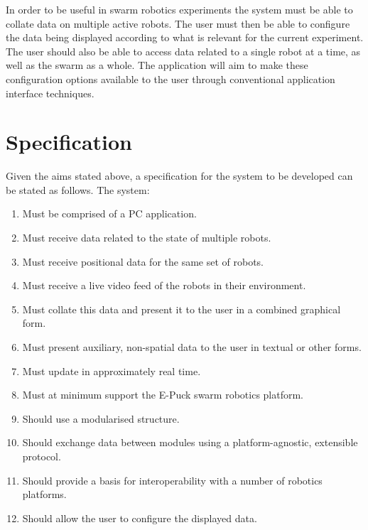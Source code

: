 \documentclass[titlepage,hidelinks,10pt]{article}
\begin{document}
\begin{multicols*}{2}

In order to be useful in swarm robotics experiments the system must be able to collate data on multiple active robots. The user must then be able to configure the data being displayed according to what is relevant for the current experiment. The user should also be able to access data related to a single robot at a time, as well as the swarm as a whole. The application will aim to make these configuration options available to the user through conventional application interface techniques.

\section{Specification}
Given the aims stated above, a specification for the system to be developed can be stated as follows. The system:

\begin{enumerate}
	\item Must be comprised of a PC application.
	\item Must receive data related to the state of multiple robots.
	\item Must receive positional data for the same set of robots.
	\item Must receive a live video feed of the robots in their environment.
	\item Must collate this data and present it to the user in a combined graphical form.
	\item Must present auxiliary, non-spatial data to the user in textual or other forms.
	\item Must update in approximately real time.
	\item Must at minimum support the E-Puck swarm robotics platform.
	\item Should use a modularised structure.
	\item Should exchange data between modules using a platform-agnostic, extensible protocol.
	\item Should provide a basis for interoperability with a number of robotics platforms.
	\item Should allow the user to configure the displayed data.
\end{enumerate}


\end{multicols*}
\end{document}
